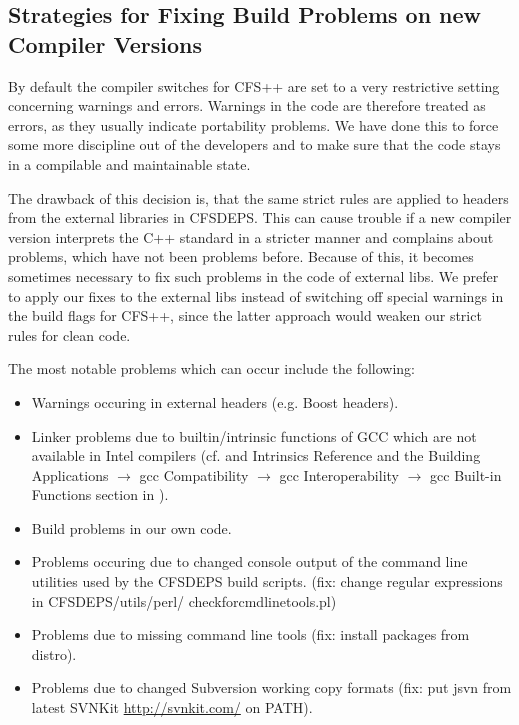 \subsection{Strategies for Fixing Build Problems on new Compiler Versions}

By  default the  compiler switches  for CFS++  are set  to a  very restrictive
setting concerning  warnings and  errors. Warnings in  the code  are therefore
treated as errors, as they usually indicate portability problems. We have done
this to force some more discipline out of the developers and to make sure that
the code stays in a compilable and maintainable state.

The drawback  of this decision is, that  the same strict rules  are applied to
headers from  the external libraries in  CFSDEPS. This can cause  trouble if a
new  compiler version interprets  the C++  standard in  a stricter  manner and
complains about  problems, which  have not been  problems before.   Because of
this,  it becomes  sometimes necessary  to fix  such problems  in the  code of
external libs.  We prefer to apply our  fixes to the external  libs instead of
switching off special warnings in the  build flags for CFS++, since the latter
approach would weaken our strict rules for clean code.

The most notable problems which can occur include the following:
\begin{itemize}
\item Warnings occuring in external headers (e.g. Boost headers).
\item Linker problems due to  builtin/intrinsic functions of GCC which are not
available  in   Intel  compilers  (cf.    \cite{WikiIntrinsic,  GCCExtensions,
MSVCIntrinsics}  and  Intrinsics   Reference  and  the  Building  Applications
$\rightarrow$    gcc   Compatibility   $\rightarrow$    gcc   Interoperability
$\rightarrow$ gcc Built-in Functions section in \cite{IntelCOnlineDoc}).
\item Build problems in our own code.
\item  Problems occuring due  to changed  console output  of the  command line
utilities used by the CFSDEPS  build scripts. (fix: change regular expressions
in CFSDEPS/utils/perl/ checkforcmdlinetools.pl)
\item Problems due  to missing command line tools  (fix: install packages from
distro).
\item Problems due  to changed Subversion working copy  formats (fix: put jsvn
from latest SVNKit \url{http://svnkit.com/} on PATH).
\end{itemize}

